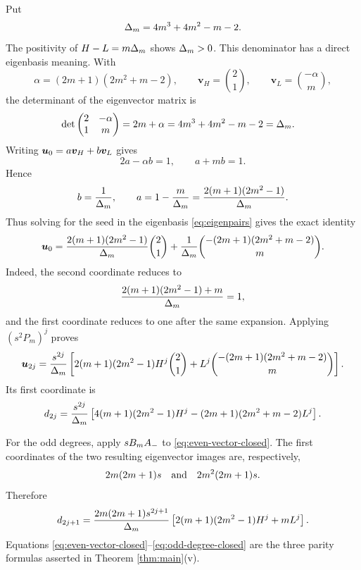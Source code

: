 \documentclass[11pt]{article}
\theoremstyle{definition}
\theoremstyle{remark}
\begin{document}
Put
\[
\Delta_m=4m^3+4m^2-m-2.
\]
The positivity of \(H-L=m\Delta_m\) shows \(\Delta_m>0\).  This denominator has a
direct eigenbasis meaning.  With
\[
\alpha=(2m+1)(2m^2+m-2),\qquad
\boldsymbol{v}_H=\binom21,
\qquad
\boldsymbol{v}_L=\binom{-\alpha}{m},
\]
the determinant of the eigenvector matrix is
\begin{align*}
\det\begin{pmatrix}2&-\alpha\\1&m\end{pmatrix}
&=2m+\alpha
=4m^3+4m^2-m-2
=\Delta_m.
\end{align*}
Writing \(\boldsymbol{u}_0=a\boldsymbol{v}_H+b\boldsymbol{v}_L\) gives
\[
2a-\alpha b=1,
\qquad
a+mb=1.
\]
Hence
\[
b=\frac1{\Delta_m},
\qquad
a=1-\frac{m}{\Delta_m}
=\frac{2(m+1)(2m^2-1)}{\Delta_m}.
\]
Thus solving for the seed in the eigenbasis \eqref{eq:eigenpairs} gives the
exact identity
\begin{equation}
\boldsymbol{u}_0=
\frac{2(m+1)(2m^2-1)}{\Delta_m}\binom21
+\frac1{\Delta_m}
\binom{-(2m+1)(2m^2+m-2)}m.
\label{eq:seed-decomposition}
\end{equation}
Indeed, the second coordinate reduces to
\[
\frac{2(m+1)(2m^2-1)+m}{\Delta_m}=1,
\]
and the first coordinate reduces to one after the same expansion.  Applying
\((s^2P_m)^j\) proves
\begin{equation}
\boldsymbol{u}_{2j}=\frac{s^{2j}}{\Delta_m}\left[
2(m+1)(2m^2-1)H^j\binom21
+L^j\binom{-(2m+1)(2m^2+m-2)}m\right].
\label{eq:even-vector-closed}
\end{equation}
Its first coordinate is
\begin{equation}
d_{2j}=\frac{s^{2j}}{\Delta_m}\left[
4(m+1)(2m^2-1)H^j
-(2m+1)(2m^2+m-2)L^j\right].
\label{eq:even-degree-closed}
\end{equation}

For the odd degrees, apply \(sB_mA_{-}\) to
\eqref{eq:even-vector-closed}.  The first coordinates of the two resulting
eigenvector images are, respectively,
\[
2m(2m+1)s
\quad\hbox{and}\quad
2m^2(2m+1)s.
\]
Therefore
\begin{equation}
d_{2j+1}=\frac{2m(2m+1)s^{2j+1}}{\Delta_m}\left[
2(m+1)(2m^2-1)H^j+mL^j\right].
\label{eq:odd-degree-closed}
\end{equation}
Equations \eqref{eq:even-vector-closed}--\eqref{eq:odd-degree-closed} are the
three parity formulas asserted in Theorem \ref{thm:main}(v).
\end{document}
